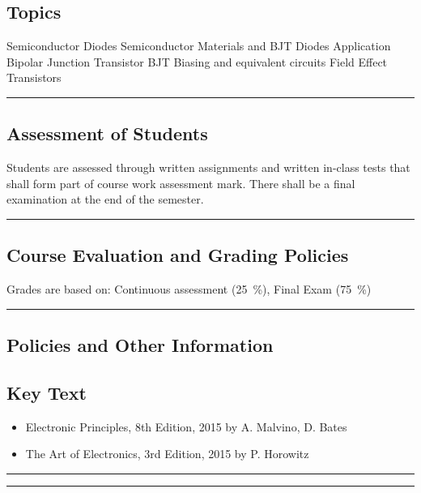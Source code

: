 \subsection*{Topics}
\begin{outline}
    \1 Semiconductor Diodes
    \1 Semiconductor Materials and BJT
    \1 Diodes Application
    \1 Bipolar Junction Transistor
    \1 BJT Biasing and equivalent circuits
    \1 Field Effect Transistors
\end{outline}
\vspace{2ex} \hrule\vspace{2ex}

\subsection*{Assessment of Students}
\begin{outline}
    \1 Students are assessed through written assignments and written in-class tests that shall form part of course work assessment mark.
    \1 There shall be a final examination at the end of the semester.
\end{outline}
\vspace{2ex}\hrule\vspace{2ex}

\subsection*{Course Evaluation and Grading Policies}
Grades are based on:
Continuous assessment (\qty{25}{\percent}),
Final Exam (\qty{75}{\percent})
\vspace{2ex}\hrule\vspace{2ex}

\subsection*{Policies and Other Information}
\subsection*{Key Text}
\begin{itemize}
    \item Electronic Principles, 8th Edition, 2015 by A. Malvino, D. Bates
    \item The Art of Electronics, 3rd Edition, 2015 by P. Horowitz
\end{itemize}
\vspace{2ex}\hrule
\vspace{2ex}\hrule\vspace{2ex}

